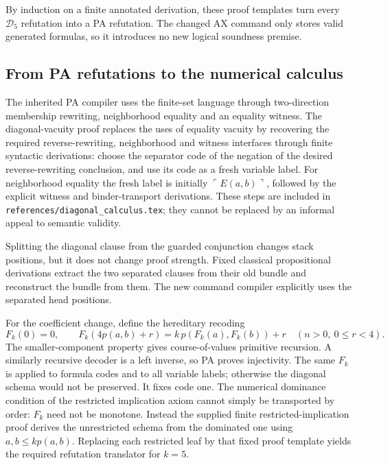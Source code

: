 \documentclass[11pt,letterpaper]{article}
\newcommand{\file}[1]{\texttt{\nolinkurl{#1}}}
\begin{document}
By induction on a finite annotated derivation, these proof templates turn
every $\mathcal D_5$ refutation into a PA refutation. The changed AX
command only stores valid generated formulas, so it introduces no new
logical soundness premise.

\subsection{From PA refutations to the numerical calculus}

The inherited PA compiler uses the finite-set language through
two-direction membership rewriting, neighborhood equality and an equality
witness. The diagonal-vacuity proof replaces the uses of equality vacuity by
recovering the required reverse-rewriting, neighborhood and witness
interfaces through finite syntactic derivations: choose the
separator code of the negation of the desired reverse-rewriting conclusion,
and use its code as a fresh variable label. For neighborhood equality the
fresh label is initially $\ulcorner E(a,b)\urcorner$, followed by the
explicit witness and binder-transport derivations. These steps are included
in \file{references/diagonal_calculus.tex}; they cannot be replaced by
an informal appeal to semantic validity.

Splitting the diagonal clause from the guarded conjunction changes stack
positions, but it does not change proof strength. Fixed classical
propositional derivations extract the two separated clauses from their
old bundle and reconstruct the bundle from them. The new command
compiler explicitly uses the separated head positions.

For the coefficient change, define the hereditary recoding
\[
F_k(0)=0,\qquad
F_k(4p(a,b)+r)=k\,p(F_k(a),F_k(b))+r
\quad(n>0,\ 0\le r<4).
\]
The smaller-component property gives course-of-values primitive recursion.
A similarly recursive decoder is a left inverse, so PA proves injectivity.
The same $F_k$ is applied to formula codes and to all variable labels;
otherwise the diagonal schema would not be preserved. It fixes code one.
The numerical dominance condition of the restricted implication axiom
cannot simply be transported by order: $F_k$ need not be monotone.
Instead the supplied finite restricted-implication proof derives the
unrestricted schema from the dominated one using
$a,b\le kp(a,b)$. Replacing each restricted leaf by that fixed proof
template yields the required refutation translator for $k=5$.
\end{document}
